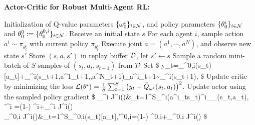 \begin{algorithm}[thpb]
	\caption{\textbf{Actor-Critic for Robust Multi-Agent RL:} } 
	\label{alg:batch_AC}
	\begin{algorithmic}[1] 
		\STATE Initialization of Q-value parameters $\{\omega^i_0\}_{i\in\mathcal{N}}$, and policy parameters $\{\theta^i_0\}_{i\in\mathcal{N}}$ and $\theta^0_0:=\{\theta^{0,i}_0\}_{i\in\mathcal{N}}$.  
		\STATE Receive an initial state $s$ 
		\STATE For each agent $i$, sample action $a^i\sim \pi_{\theta^i_t}$ with current policy $ \pi_{\theta^i_t}$
		\STATE Execute joint $a=(a^1,\cdots,a^N)$, and observe 
		new state $s'$
		\STATE Store $(s,a,s')$ in replay buffer $\mathcal{D}$, let $s'\leftarrow s$
		\STATE Sample a random mini-batch of $S$ samples of $(s_t,a_t,s_{t+1})$ from $\mathcal{D}$
		\STATE Set  
		\$
		y_t=\pi_{\theta^{0,i}}(s_t)[a_t]+\gamma \oQ_{\omega^i}(s_{t+1},a^1_{t+1},\cdots,a^N_{t+1})\biggiven_{a^i_{t+1}\sim\pi_{\theta^i}(\cdot\given s_{t+1})},
		\$
		\STATE Update critic by minimizing the loss $\mathcal{L}(\theta^i)=\frac{1}{S}\sum_{t=1}^S\big(y_t-\bar{Q}_{\omega^i}(s_{t},a_{t})\big)^2$. 
		\STATE Update actor using the sampled policy gradient
		\$
		\nabla_{\theta^i} J^i(\theta)&\approx{}\sum_{t=1}^S\nabla\log\pi_{\theta^i}(a^i_t\given s_t)\oQ^i_{\tilde{\pi}_\theta}(s_t,a_t),~ 
		\theta'^i =(1-\tau) \theta^i+\tau\nabla_{\theta^i} J^i(\theta)\\
		\nabla_{\theta^{0,i}} J^i(\theta)&\approx{}\sum_{t=1}^S\nabla\pi_{\theta^{0,i}}(s_t)[a_t],\qquad\qquad\theta'^{0,i}=(1-\tau) \theta^{0,i}+\tau\nabla_{\theta^{0,i}} J^i(\theta)
		\$ 
		\ENDFOR
		\ENDFOR
		\ENDFOR
	\end{algorithmic}
\end{algorithm}
 

